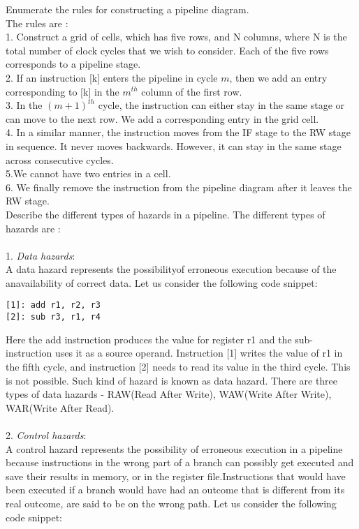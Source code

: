 \begin{ExerciseList}
\Exercise
Enumerate the rules for constructing a pipeline diagram.
\Answer
\hspace{3mm} \\
The rules are : \\
1. Construct a grid of cells, which has five rows, and N columns, where N is the total number of clock cycles that we wish to consider. Each of the five rows corresponds to a pipeline stage. \\
2. If an instruction [k] enters the pipeline in cycle $m$, then we add an entry corresponding to [k] in the $m^{th}$ column of the first row. \\
3. In the $(m+1)^{th}$ cycle, the instruction can either stay in the same stage or can move to the next row. We add a corresponding entry in the grid cell. \\
4. In a similar manner, the instruction moves from the IF stage to the RW stage in sequence. It never moves backwards. However, it can stay in the same stage across consecutive cycles. \\
5.We cannot have two entries in a cell. \\
6. We finally remove the instruction from the pipeline diagram after it leaves the RW stage. \\
\Exercise
Describe the different types of hazards in a pipeline.
\Answer
The different types of hazards are : \\ \\
1. \textit{Data hazards}: \\
A data hazard represents the possibilityof erroneous execution because of the anavailability of correct data. Let us consider the following code snippet: 
\begin{Verbatim}
[1]: add r1, r2, r3 
[2]: sub r3, r1, r4 
\end{Verbatim}
Here the add instruction produces the value for register r1 and the sub-instruction uses it as a source operand. Instruction [1] writes the value of r1 in the fifth cycle, and instruction [2] needs to read its value in the third cycle. This is not possible. Such kind of hazard is known as data hazard. There are three types of data hazards - RAW(Read After Write), WAW(Write After Write), WAR(Write After Read). \\ \\
2. \textit{Control hazards}: \\
A control hazard represents the possibility of erroneous execution in a pipeline because instructions in the wrong part of a branch can possibly get executed and save their results in memory, or in the register file.Instructions that would have been executed if a branch would have had an outcome that is different from its real outcome, are said to be on the wrong path. Let us consider the following code snippet: 

\end{ExerciseList}
